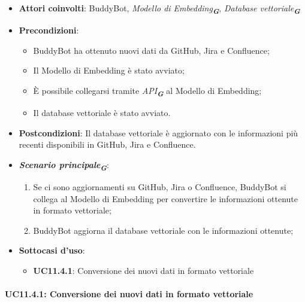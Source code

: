 \begin{itemize}
    \item \textbf{Attori coinvolti}: BuddyBot, \emph{Modello di Embedding}\textsubscript{\textbf{\textit{G}}}, 
    \emph{Database vettoriale}\textsubscript{\textbf{\textit{G}}}
    \item \textbf{Precondizioni}: 
    \begin{itemize}
        \item BuddyBot ha ottenuto nuovi dati da GitHub, Jira e Confluence;
        \item Il Modello di Embedding è stato avviato;
        \item È possibile collegarsi tramite \emph{API}\textsubscript{\textbf{\textit{G}}} al Modello di Embedding;
        \item Il database vettoriale è stato avviato.
    \end{itemize}
    \item \textbf{Postcondizioni}: Il database vettoriale è aggiornato con le informazioni più recenti disponibili in GitHub, Jira e Confluence.
    \item \textbf{\emph{Scenario principale}\textsubscript{\textbf{\textit{G}}}}:
    \begin{enumerate}
        \item Se ci sono aggiornamenti su GitHub, Jira o Confluence, BuddyBot si collega al Modello di Embedding per convertire le informazioni 
        ottenute in formato vettoriale;
        \item BuddyBot aggiorna il database vettoriale con le informazioni ottenute;
    \end{enumerate}
    \item \textbf{Sottocasi d'uso}:
    \begin{itemize}
        \item \textbf{UC11.4.1}: Conversione dei nuovi dati in formato vettoriale
    \end{itemize}
\end{itemize}



\paragraph{UC11.4.1: Conversione dei nuovi dati in formato vettoriale}

